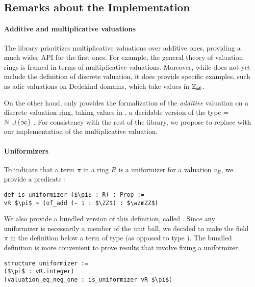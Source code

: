 \documentclass[sigplan,10pt, nonacm, review]{acmart}
\begin{document}
\subsection{Remarks about the Implementation}\label{subsec:implementation}

\paragraph{Additive and multiplicative valuations}
The \mathlib library prioritizes multiplicative valuations over additive ones, providing a much wider API for the first ones. For example, the general theory of valuation rings\href{https://leanprover-community.github.io/mathlib_docs/ring_theory/valuation/valuation_ring.html#valuation_ring.valuation}{\extlink} is framed in terms of multiplicative valuations. Moreover, while \mathlib does not yet include the definition of discrete valuation, it does provide specific examples, such as adic valuations on Dedekind domains, which take values in $\mathbb{Z}_{\mathtt{m}0}$.

On the other hand, \mathlib only provides the formalization of the \emph{additive} valuation \href{https://leanprover-community.github.io/mathlib_docs/ring_theory/discrete_valuation_ring/basic.html#discrete_valuation_ring.add_val}{\extlink} on a discrete valuation ring, taking values in , a decidable version of the type =\,$\mathbb{N}\mathtt{\ \cup \,\{\infty\}\ }$. 
For consistency with the rest of the library, we propose to replace  with our implementation of the multiplicative valuation.


\paragraph{Uniformizers}
To indicate that a term \code{(}$\pi$ in a ring $R$ is a uniformizer for a valuation $v_R$, we provide a predicate :\href{https://github.com/LCFT-Lean/local_fields/blob/76ad487d09babdb0018f394a5634526637ee014a/src/discrete_valuation_ring/basic.lean#L133}{\extlink}
\begin{lstlisting}
def is_uniformizer ($\pi$ : R) : Prop := 
vR $\pi$ = (of_add (- 1 : $\ZZ$) : $\wzmZZ$)
\end{lstlisting}

We also provide a bundled version of this definition, called \href{https://github.com/LCFT-Lean/local_fields/blob/76ad487d09babdb0018f394a5634526637ee014a/src/discrete_valuation_ring/basic.lean#L144}{\extlink}. Since any uniformizer is necessarily a member of the unit ball, we decided to make the field $\pi$ in the definition below a term of type  (as opposed to type ). The bundled definition is more convenient to prove results that involve fixing a uniformizer.
\begin{lstlisting}
structure uniformizer :=
($\pi$ : vR.integer)
(valuation_eq_neg_one : is_uniformizer vR $\pi$)
\end{lstlisting}
\end{document}
